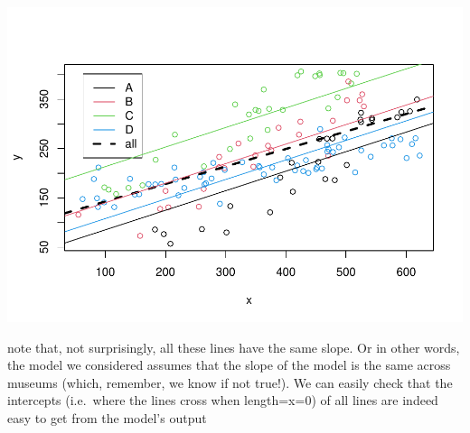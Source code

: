 \documentclass[
]{book}
\begin{document}
\includegraphics{ECOMODbook_files/figure-latex/a7.13-1.pdf}

note that, not surprisingly, all these lines have the same slope. Or in other words, the model we considered assumes that the slope of the model is the same across museums (which, remember, we know if not true!). We can easily check that the intercepts (i.e.~where the lines cross when length=x=0) of all lines are indeed easy to get from the model's output
\end{document}
